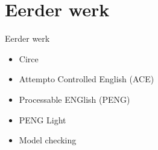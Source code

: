 \documentclass[notes]{beamer}
\newcommand{\seperation}{
	\vspace{1em}
	\ppause
}
\newcommand{\hitem}{
	\ppause
	\item
}
\newcommand{\ppause}{\onslide<+>}
\begin{document}
	\section{Eerder werk}
	\begin{frame}{Eerder werk}
		\begin{itemize}
			\ppause
			\hitem Circe \cite{Ambriola1997}
			
			\seperation
			\item Attempto Controlled English (ACE) \cite{Fuchs2008}
			
			\seperation
			\item Processable ENGlish (PENG) \cite{Schwitter2003, Schwitter2006}
			\item PENG Light \cite{Schwitter2008}
			
			\seperation
			\item Model checking \cite{Flake2002, Konrad2005}
		\end{itemize}
		

\end{frame}
\end{document}
